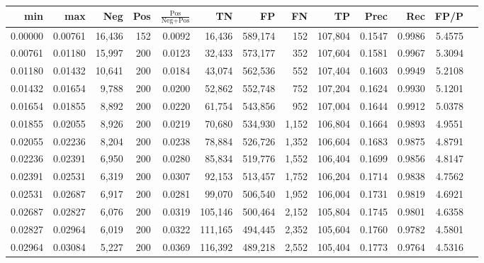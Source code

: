 \begin{tabular}{rrrrrrrrrrrrr}
\toprule
    min &     max &    Neg & Pos & $\frac{\text{Pos}}{\text{Neg}+\text{Pos}}$ &      TN &      FP &      FN &      TP &   Prec &    Rec &   FP/P \\
\midrule
0.00000 & 0.00761 & 16,436 & 152 &                                     0.0092 &  16,436 & 589,174 &     152 & 107,804 & 0.1547 & 0.9986 & 5.4575 \\
0.00761 & 0.01180 & 15,997 & 200 &                                     0.0123 &  32,433 & 573,177 &     352 & 107,604 & 0.1581 & 0.9967 & 5.3094 \\
0.01180 & 0.01432 & 10,641 & 200 &                                     0.0184 &  43,074 & 562,536 &     552 & 107,404 & 0.1603 & 0.9949 & 5.2108 \\
0.01432 & 0.01654 &  9,788 & 200 &                                     0.0200 &  52,862 & 552,748 &     752 & 107,204 & 0.1624 & 0.9930 & 5.1201 \\
0.01654 & 0.01855 &  8,892 & 200 &                                     0.0220 &  61,754 & 543,856 &     952 & 107,004 & 0.1644 & 0.9912 & 5.0378 \\
0.01855 & 0.02055 &  8,926 & 200 &                                     0.0219 &  70,680 & 534,930 &   1,152 & 106,804 & 0.1664 & 0.9893 & 4.9551 \\
0.02055 & 0.02236 &  8,204 & 200 &                                     0.0238 &  78,884 & 526,726 &   1,352 & 106,604 & 0.1683 & 0.9875 & 4.8791 \\
0.02236 & 0.02391 &  6,950 & 200 &                                     0.0280 &  85,834 & 519,776 &   1,552 & 106,404 & 0.1699 & 0.9856 & 4.8147 \\
0.02391 & 0.02531 &  6,319 & 200 &                                     0.0307 &  92,153 & 513,457 &   1,752 & 106,204 & 0.1714 & 0.9838 & 4.7562 \\
0.02531 & 0.02687 &  6,917 & 200 &                                     0.0281 &  99,070 & 506,540 &   1,952 & 106,004 & 0.1731 & 0.9819 & 4.6921 \\
0.02687 & 0.02827 &  6,076 & 200 &                                     0.0319 & 105,146 & 500,464 &   2,152 & 105,804 & 0.1745 & 0.9801 & 4.6358 \\
0.02827 & 0.02964 &  6,019 & 200 &                                     0.0322 & 111,165 & 494,445 &   2,352 & 105,604 & 0.1760 & 0.9782 & 4.5801 \\
0.02964 & 0.03084 &  5,227 & 200 &                                     0.0369 & 116,392 & 489,218 &   2,552 & 105,404 & 0.1773 & 0.9764 & 4.5316 \\

\end{tabular}
